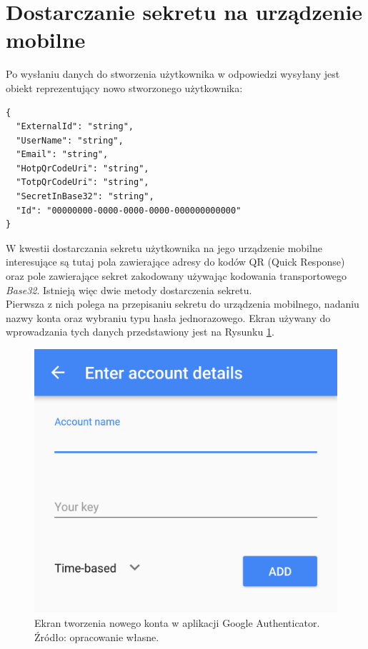 \section{Dostarczanie sekretu na urządzenie mobilne}
Po wysłaniu danych do stworzenia użytkownika w odpowiedzi wysyłany jest obiekt reprezentujący
nowo stworzonego użytkownika:
\begin{lstlisting}
{
  "ExternalId": "string",
  "UserName": "string",
  "Email": "string",
  "HotpQrCodeUri": "string",
  "TotpQrCodeUri": "string",
  "SecretInBase32": "string",
  "Id": "00000000-0000-0000-0000-000000000000"
}
\end{lstlisting}
W kwestii dostarczania sekretu użytkownika na jego urządzenie mobilne interesujące są tutaj pola
zawierające adresy do kodów QR (Quick Response) oraz pole zawierające sekret zakodowany używając kodowania transportowego \textit{Base32}.
Istnieją więc dwie metody dostarczenia sekretu. \\
Pierwsza z nich polega na przepisaniu sekretu do urządzenia mobilnego, nadaniu nazwy konta oraz wybraniu typu hasła jednorazowego.
Ekran używany do wprowadzania tych danych przedstawiony jest na Rysunku \ref{mobile-manual}.
\begin{figure}[t]
    \centering
	\includegraphics[width=\textwidth]{content/images/mobile-manual}
    \caption{Ekran tworzenia nowego konta w aplikacji Google Authenticator. Źródło: opracowanie własne.}
    \label{mobile-manual}
\end{figure} \\
